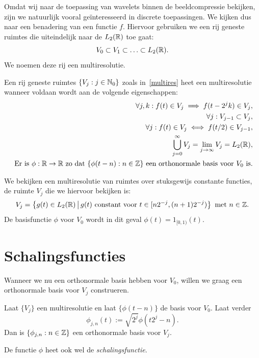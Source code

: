 Omdat wij naar de toepassing van wavelets binnen de beeldcompressie bekijken, 
zijn we natuurlijk vooral ge\"interesseerd in discrete toepassingen.
We kijken dus naar een benadering van een functie $f$. Hiervoor gebruiken we een rij geneste ruimtes die 
uiteindelijk naar de $L_2(\mathbb{R})$ toe gaat:
\begin{equation}
  \label{multires}
  V_0 \subset V_1 \subset \ldots \subset L_2(\mathbb{R}).
\end{equation}
We noemen deze rij een multiresolutie.
\begin{definitie}
  Een rij geneste ruimtes $\{ V_j: j \in \mathbb{N}_0 \}$ zoals in~\eqref{multires} heet een multiresolutie wanneer voldaan wordt aan de volgende eigenschappen:
  \begin{eqnarray}
    \forall j, k: f(t) \in V_j \implies f(t - 2^j k) \in V_j, \\
    \forall j: V_{j-1} \subset V_j, \\
    \forall j: f(t) \in V_j \iff f(t/2) \in V_{j-1}, \\
    \bigcup_{j=0}^{\infty} V_j = \lim_{j\to\infty} V_j = L_2(\mathbb{R}), \\
    \text{ Er is $\phi: \mathbb{R} \to \mathbb{R}$ zo dat $\{ \phi(t-n): n \in \mathbb{Z} \}$ een orthonormale basis voor $V_0$ is.}
  \end{eqnarray}
\end{definitie}

\begin{voorbeeld} We bekijken een multiresolutie van ruimtes over stuksgewijs constante functies, 
  de ruimte $V_j$ die we hiervoor bekijken is:
  \[
  V_j = \left\{ g(t) \in L_2(\mathbb{R}) \,\big|\, g(t)\text{ constant voor }t \in [n 2^{-j}, (n+1)2^{-j}) \right \}
    \text{ met } n \in \mathbb{Z}.
    \]
    De basisfunctie $\phi$ voor $V_0$ wordt in dit geval $\phi(t) = 1_{[0,1)}(t)$.
\end{voorbeeld}

\section{Schalingsfuncties}
Wanneer we nu een orthonormale basis hebben voor $V_0$, willen we graag een orthonormale basis voor $V_j$ construeren.
\begin{stelling}
  Laat $\{ V_j \}$ een multiresolutie en laat $\{\phi(t-n) \}$ de basis voor $V_0$. Laat verder
  \[
  \phi_{j,n}(t) := \sqrt{2^j} \phi\left( t2^j - n \right).
  \]
  Dan is $\{ \phi_{j,n}: n \in \mathbb{Z} \}$ een orthonormale basis voor $V_j$. 
\end{stelling}
De functie $\phi$ heet ook wel de \emph{schalingsfunctie}.
